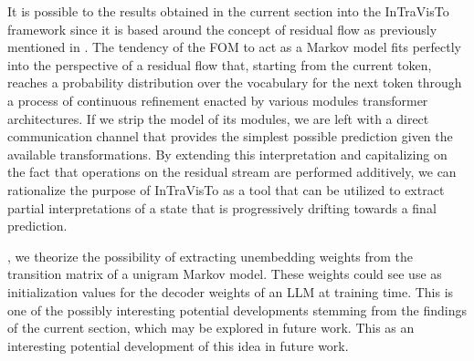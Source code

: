 It is possible to  the results obtained in the current section into the InTraVisTo framework since it is based around the concept of residual flow as previously mentioned in .
The tendency of the FOM to act as a Markov model fits perfectly into the perspective of a residual flow that, starting from the current token, reaches a probability distribution over the vocabulary for the next token through a process of continuous refinement enacted by various modules  transformer architectures.
If we strip the model of its modules, we are left with a direct communication channel that provides the simplest possible prediction given the available transformations.
By extending this interpretation and capitalizing on the fact that operations on the residual stream are performed additively, we can rationalize the purpose of InTraVisTo as a tool that can be utilized to extract partial interpretations of a state that is progressively drifting towards a final prediction.

, we theorize the possibility of extracting unembedding weights from the transition matrix of a unigram Markov model.
These weights could see use as initialization values for the decoder weights of an LLM at training time.
This is one of the possibly interesting potential developments stemming from the findings of the current section, which may be explored in future work.
This as an interesting potential development of this idea in future work.
